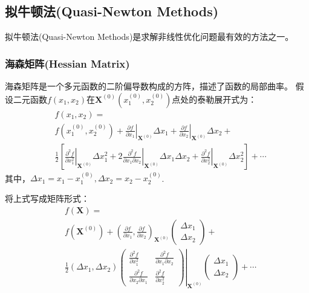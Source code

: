 \documentclass[11pt]{report}
\begin{document}
\subsection{拟牛顿法(Quasi-Newton Methods)}
拟牛顿法(Quasi-Newton Methods)是求解非线性优化问题最有效的方法之一。
\subsubsection{海森矩阵(Hessian Matrix)}
海森矩阵是一个多元函数的二阶偏导数构成的方阵，描述了函数的局部曲率。
假设二元函数$f(x_1,x_2)$在$\textbf{X}^{(0)}(x_1^{(0)},x_2^{(0)})$点处的泰勒展开式为：
\begin{equation}
	\begin{split}
		&f(x_1,x_2)=\\
		&f(x_1^{(0)},x_2^{(0)})+\left.\frac{\partial f}{\partial x_1}\right|_{\textbf{X}^{(0)}}\Delta x_1+\left.\frac{\partial f}{\partial x_2}\right|_{\textbf{X}^{(0)}}\Delta x_2+\\
		&\frac{1}{2}\left[\left.\frac{\partial^2 f}{\partial x_1^2}\right|_{\textbf{X}^{(0)}}\Delta x_1^2+\left.2\frac{\partial^2 f}{\partial x_1\partial x_2}\right|_{\textbf{X}^{(0)}}\Delta x_1\Delta x_2+\left.\frac{\partial^2 f}{\partial x_2^2}\right|_{\textbf{X}^{(0)}}\Delta x_2^2\right]+\cdots
	\end{split}
\end{equation}
其中，$\Delta x_1=x_1-x_1^{(0)},\Delta x_2=x_2-x_2^{(0)}$.
\par
将上式写成矩阵形式：
\begin{equation}
	\begin{split}
		&f(\textbf{X})=\\
		&f(\textbf{X}^{(0)})+\left(\frac{\partial f}{\partial x_1},\frac{\partial f}{\partial x_2} \right)_{\textbf{X}^{(0)}}\left(\begin{matrix}
			\Delta x_1\\
			\Delta x_2
		\end{matrix} \right)+\\
		&\frac{1}{2}(\Delta x_1,\Delta x_2 )\left.\left(\begin{matrix}
			\frac{\partial^2 f}{\partial x_1^2} & \frac{\partial^2 f}{\partial x_1\partial x_2}\\
			\frac{\partial^2 f}{\partial x_2\partial x_1} & \frac{\partial^2 f}{\partial x_2^2}
		\end{matrix}  \right)\right|_{\textbf{X}^{(0)}}\left(\begin{matrix}
			\Delta x_1\\
			\Delta x_2
		\end{matrix} \right)+\cdots
	\end{split}
\end{equation}
\end{document}
